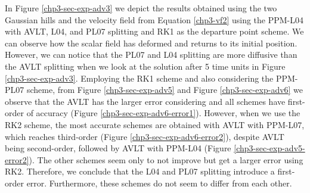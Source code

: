 In Figure \ref{chp3-sec-exp-adv3} we depict the results obtained using the two Gaussian hills and the velocity field from
Equation \eqref{chp3-vf2} using the PPM-L04 with AVLT, L04, and PL07 splitting and RK1 as the departure point scheme.
We can observe how the scalar field has deformed and returns to its initial position. However, we can notice
that the PL07 and L04 splitting are more diffusive than the AVLT splitting when we look at the solution after 5 time units in 
Figure \ref{chp3-sec-exp-adv3}.
Employing the RK1 scheme and also considering the PPM-PL07 scheme, 
from Figure \ref{chp3-sec-exp-adv5} and Figure \ref{chp3-sec-exp-adv6} we observe that the AVLT has the larger error considering and
all schemes have first-order of accuracy (Figure \ref{chp3-sec-exp-adv6-error1}).
However, when we use the RK2 scheme, the most accurate schemes are obtained with AVLT with PPM-L07,
which reaches third-order (Figure \ref{chp3-sec-exp-adv6-error2}), despite AVLT being second-order, followed by AVLT with PPM-L04 (Figure \ref{chp3-sec-exp-adv5-error2}).
The other schemes seem only to not improve but get a larger error using RK2. Therefore, we conclude that the L04 and PL07 splitting 
introduce a first-order error. Furthermore, these schemes do not seem to differ from each other.
